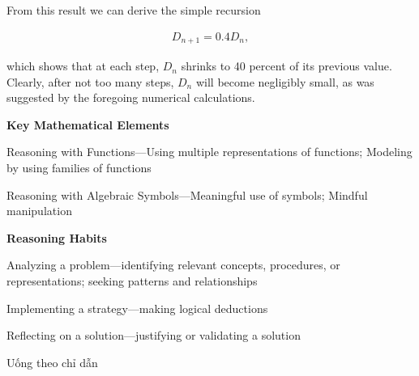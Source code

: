 \documentclass[
  10pt,
  a4paper,
  landscape,
  twoside,
  openany
]{scrbook}
\begin{document}
{\begin{description}
  From this result we can derive the simple recursion

    \begin{align*}
      D_{n+1}=0.4D_n, \tag{7}
    \end{align*} 
  
  which shows that at each step, $D_n$ shrinks to 40 percent of its previous value. Clearly, after not too many steps, $D_n$ will become negligibly small, as was suggested by the foregoing numerical calculations.
\end{description}

\noindent
\textbf{Key Mathematical Elements}

Reasoning with Functions---Using multiple representations of functions; Modeling by using families of functions

Reasoning with Algebraic Symbols---Meaningful use of symbols; Mindful
manipulation

\noindent
\textbf{Reasoning Habits}

Analyzing a problem---identifying relevant concepts, procedures, or representations; seeking patterns and relationships

Implementing a strategy---making logical deductions

Reflecting on a solution---justifying or validating a solution
}
{
Uống theo chỉ dẫn
}
\end{document}
